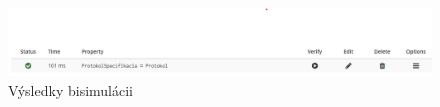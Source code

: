 \documentclass[a4paper]{article}
\begin{document}
\begin{figure}[!h]
	\centering
	\includegraphics[width=1\textwidth]{bisim2.png}
	\caption{Výsledky bisimulácii}
\end{figure}
\end{document}
